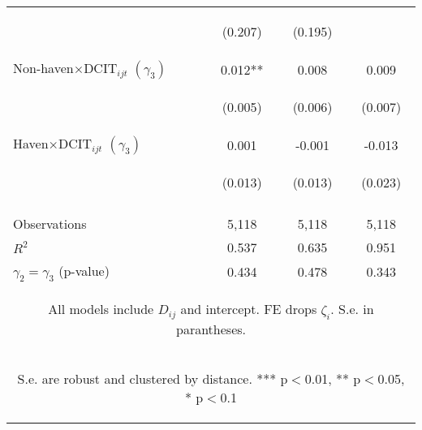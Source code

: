 \documentclass[twoside,a4paper,11pt]{article}
\begin{document}
\begin{table}[t!]
{\begin{tabular}{lccc}
			\vspace{4pt} & \begin{footnotesize}(0.207)\end{footnotesize} & \begin{footnotesize}(0.195)\end{footnotesize} & \begin{footnotesize}\end{footnotesize} \\
			Non-haven$\times\text{DCIT}_{ijt}$ $(\gamma_3)$ & 0.012** & 0.008 & 0.009 \\
			\vspace{4pt} & \begin{footnotesize}(0.005)\end{footnotesize} & \begin{footnotesize}(0.006)\end{footnotesize} & \begin{footnotesize}(0.007)\end{footnotesize} \\
			Haven$\times\text{DCIT}_{ijt}$ $(\gamma_3)$ & 0.001 & -0.001 & -0.013 \\
			& \begin{footnotesize}(0.013)\end{footnotesize} & \begin{footnotesize}(0.013)\end{footnotesize} & \begin{footnotesize}(0.023)\end{footnotesize} \\
			\vspace{4pt} & \begin{footnotesize}\end{footnotesize} & \begin{footnotesize}\end{footnotesize} & \begin{footnotesize}\end{footnotesize} \\
			Observations & 5,118 & 5,118 & 5,118 \\
			$R^2$ & 0.537 & 0.635 & 0.951 \\
			$\gamma_2=\gamma_3 $ (p-value) & 0.434 & 0.478 & 0.343 \\ \hline
			\multicolumn{4}{c}{\begin{footnotesize} All models include $ D_{ij}$ and intercept. FE drops $\zeta_i$. S.e. in parantheses.\end{footnotesize}} \\
			\multicolumn{4}{c}{\begin{footnotesize} S.e. are robust and clustered by distance. *** p$<$0.01, ** p$<$0.05, * p$<$0.1\end{footnotesize}} \\
		\end{tabular}
	}
\end{table}
\end{document}
